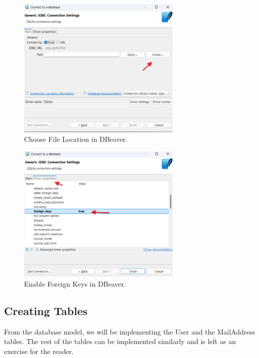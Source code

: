 \documentclass[a4paper,11pt,oneside]{article}
\begin{document}
\begin{sloppypar}
\begin{figure}[!htb]
  \centering
  \includegraphics[width=0.7\textwidth]{dbeaver/create_choose_file_location.png}
  \caption{Choose File Location in DBeaver.}
  \label{fig:create_choose_file_location}
\end{figure}

\begin{figure}[!htb]
  \centering
  \includegraphics[width=0.7\textwidth]{dbeaver/create_foreign_keys_enable.png}
  \caption{Enable Foreign Keys in DBeaver.}
  \label{fig:create_foreign_keys_enable}
\end{figure}



\subsection{Creating Tables}
\label{dbeaverCreatingTable}
From the database model, we will be implementing the User and the MailAddress tables. The rest of the tables can be implemented similarly and is left as an exercise for the reader.


\end{sloppypar}
\end{document}
